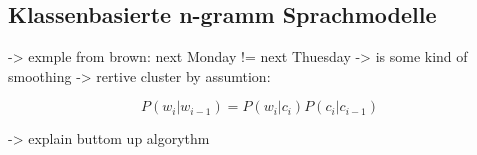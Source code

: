\subsection{Klassenbasierte n-gramm Sprachmodelle}
\label{sec:brownClustering}
    
    -> exmple from brown: next Monday != next Thuesday
    -> is some kind of smoothing
    -> rertive cluster by assumtion:
    
	\begin{equation}
   		P(w_i|w_{i-1}) = P(w_i|c_i) P(c_i|c_{i-1})
        \label{eq:wordPropability}
	\end{equation}
        
    -> explain buttom up algorythm